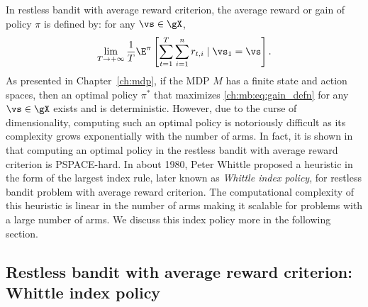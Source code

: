 In restless bandit with average reward criterion, the average reward or gain of policy $\pi$ is defined by: for any $\vs\in\gX$,
\begin{equation}
    \label{ch:mb:eq:gain_defn}
    \lim_{T\to+\infty}\frac1T \E^\pi\left[ \sum_{t=1}^{T} \sum_{i=1}^nr_{t,i} \mid \vs_1=\vs\right].
\end{equation}
As presented in Chapter~\ref{ch:mdp}, if the MDP $M$ has a finite state and action spaces, then an optimal policy $\pi^*$ that maximizes \eqref{ch:mb:eq:gain_defn} for any $\vs\in\gX$ exists and is deterministic.
However, due to the curse of dimensionality, computing such an optimal policy is notoriously difficult as its complexity grows exponentially with the number of arms.
In fact, it is shown in \cite[Theorem~4]{papadimitriou1994complexity} that computing an optimal policy in the restless bandit with average reward criterion is PSPACE-hard.
In about 1980, Peter Whittle proposed a heuristic in the form of the largest index rule, later known as \emph{Whittle index policy}, for restless bandit problem with average reward criterion.
The computational complexity of this heuristic is linear in the number of arms making it scalable for problems with a large number of arms.  
We discuss this index policy more in the following section.


\subsection{Restless bandit with average reward criterion: Whittle index policy}
\label{ch:mb:ssec:whittle_idx}


